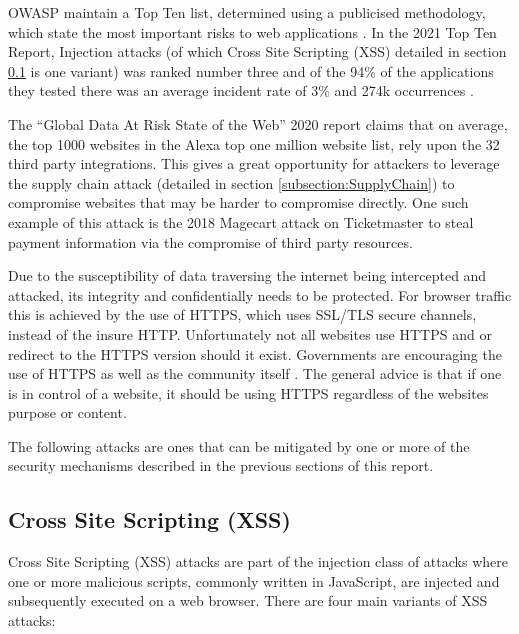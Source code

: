 \documentclass{mscreport}
\begin{document}
\vspace{0.3cm} \noindent
OWASP maintain a Top Ten list, determined using a publicised methodology, which state the most important risks to web applications \cite{Kellezi2021-nd,noauthor_undated-kz}. In the 2021 Top Ten Report, Injection attacks (of which Cross Site Scripting (XSS) detailed in section \ref{subsection:XSS} is one variant) was ranked number three and of the 94\% of the applications they tested there was an average incident rate of 3\% and 274k occurrences \cite{noauthor_undated-gt}.

\vspace{0.3cm} \noindent
The ``Global Data At Risk State of the Web'' 2020 report \cite{Tala_Security2020-ee} claims that on average, the top 1000 websites in the Alexa top one million website list, rely upon the 32 third party integrations. This gives a great opportunity for attackers to leverage the supply chain attack (detailed in section \ref{subsection:SupplyChain}) to compromise websites that may be harder to compromise directly. One such example of this attack is the 2018 Magecart attack on Ticketmaster \cite{Herman2019-zb} to steal payment information via the compromise of third party resources.

\vspace{0.3cm} \noindent
Due to the susceptibility of data traversing the internet being intercepted and attacked, its integrity and confidentially needs to be protected. For browser traffic this is achieved by the use of HTTPS, which uses SSL/TLS secure channels, instead of the insure HTTP. Unfortunately not all websites use HTTPS and or redirect to the HTTPS version should it exist. Governments are encouraging the use of HTTPS \cite{noauthor_undated-oz} as well as the community itself \cite{noauthor_undated-xk}. The general advice is that if one is in control of a website, it should be using HTTPS regardless of the websites purpose or content. 

\vspace{0.3cm} \noindent
The following attacks are ones that can be mitigated by one or more of the security mechanisms described in the previous sections of this report.

\subsection{Cross Site Scripting (XSS)}
\label{subsection:XSS}

Cross Site Scripting (XSS) attacks are part of the injection class of attacks where one or more malicious scripts, commonly written in JavaScript, are injected and subsequently executed on a web browser. There are four main variants of XSS attacks:
\end{document}
